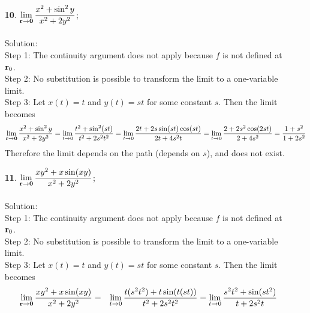 \documentclass[12pt]{amsbook}
\begin{document}
\begin{enumerate}
{\sf Step 1}: The continuity argument does not apply because $f$ is not defined at ${\bf r}_0$.
\\
{\sf Step 2}: Let $u=\|{\bf r}\|$. Then the limit becomes
$$\lim_{{\bf r} \rightarrow {\bf 0}}\frac{e^{\|{\bf r}\|}-1-\|{\bf r}\|}{\|{\bf r}\|^2}=\lim_{u \rightarrow 0}\frac{e^u-1-u}{u^2}=\lim_{u \rightarrow 0}\frac{e^u-1}{2u}=\lim_{u \rightarrow 0}\frac{e^u}{2}=\frac{1}{2}$$
where l'Hospital's rule has been used twice.
\\
\item[{\small\bf 10}.] $\! \begin{aligned}[t]
\lim_{{\bf r} \rightarrow {\bf 0}}\frac{x^2+\sin^2y}{x^2+2y^2} \end{aligned}$;
\\
\\
{\sc Solution}:
\\
{\sf Step 1}: The continuity argument does not apply because $f$ is not defined at ${\bf r}_0$.
\\
{\sf Step 2}: No substitution is possible to transform the limit to a one-variable
limit.
\\
{\sf Step 3}: Let $x(t)=t$ and $y(t)=st$ for some constant $s$. Then the limit becomes
$$\lim_{{\bf r} \rightarrow {\bf 0}}\frac{x^2+\sin^2y}{x^2+2y^2}=\lim_{t \rightarrow 0}\frac{t^2+\sin^2(st)}{t^2+2s^2t^2}=\lim_{t \rightarrow 0}\frac{2t+2s\sin(st)\cos(st)}{2t+4s^2t}=\lim_{t \rightarrow 0}\frac{2+2s^2\cos(2st)}{2+4s^2}=\frac{1+s^2}{1+2s^2}$$
Therefore the limit depends on the path (depends on $s$), and does not exist.
\\
\item[{\small\bf 11}.] $\! \begin{aligned}[t]
\lim_{{\bf r} \rightarrow {\bf 0}}\frac{xy^2+x\sin(xy)}{x^2+2y^2} \end{aligned}$;
\\
\\
{\sc Solution}:
\\
{\sf Step 1}: The continuity argument does not apply because $f$ is not defined at ${\bf r}_0$.
\\
{\sf Step 2}: No substitution is possible to transform the limit to a one-variable
limit.
\\
{\sf Step 3}: Let $x(t)=t$ and $y(t)=st$ for some constant $s$. Then the limit becomes
\begin{eqnarray*}
\lim_{{\bf r} \rightarrow {\bf 0}}\frac{xy^2+x\sin(xy)}{x^2+2y^2}&=&\lim_{t \rightarrow 0}\frac{t(s^2t^2)+t\sin(t(st))}{t^2+2s^2t^2}=\lim_{t \rightarrow 0}\frac{s^2t^2+\sin(st^2)}{t+2s^2t} \\

\end{eqnarray*}
\end{enumerate}
\end{document}
